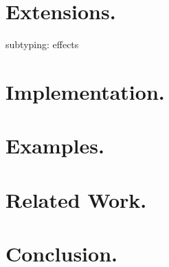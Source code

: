 \documentclass[a4paper]{llncs}
\begin{document}
\section{Extensions.}

subtyping: effects

\section{Implementation.}

\section{Examples.}

\section{Related Work.}

\section{Conclusion.}
\end{document}

